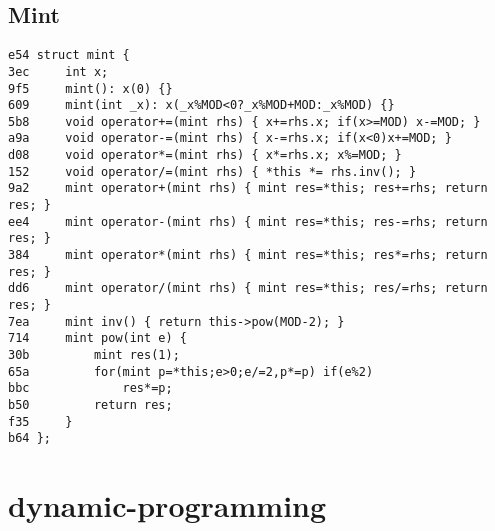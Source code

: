 \documentclass[11pt, a4paper, twoside]{article}
\begin{document}
\subsection{Mint}
\begin{lstlisting}
e54 struct mint {
3ec 	int x;
9f5 	mint(): x(0) {}
609 	mint(int _x): x(_x%MOD<0?_x%MOD+MOD:_x%MOD) {}
5b8 	void operator+=(mint rhs) { x+=rhs.x; if(x>=MOD) x-=MOD; }
a9a 	void operator-=(mint rhs) { x-=rhs.x; if(x<0)x+=MOD; }
d08 	void operator*=(mint rhs) { x*=rhs.x; x%=MOD; }
152 	void operator/=(mint rhs) { *this *= rhs.inv(); }
9a2 	mint operator+(mint rhs) { mint res=*this; res+=rhs; return res; }
ee4 	mint operator-(mint rhs) { mint res=*this; res-=rhs; return res; }
384 	mint operator*(mint rhs) { mint res=*this; res*=rhs; return res; }
dd6 	mint operator/(mint rhs) { mint res=*this; res/=rhs; return res; }
7ea 	mint inv() { return this->pow(MOD-2); }
714 	mint pow(int e) {
30b 		mint res(1);
65a 		for(mint p=*this;e>0;e/=2,p*=p) if(e%2)
bbc 			res*=p;
b50 		return res;
f35 	}
b64 };
\end{lstlisting}



%
%

\section{dynamic-programming}
\end{document}
